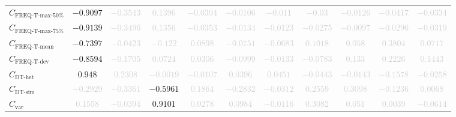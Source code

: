 \documentclass{standalone}
\newcommand{\varietyname}{\text{var}}
\newcommand{\variety}{C_{\varietyname}}
\newcommand{\freqmaxfiftyname}{\text{FREQ-T-max-50\%}}
\newcommand{\freqmaxfifty}{C_{\freqmaxfiftyname}}
\newcommand{\freqmaxseventyfivename}{\text{FREQ-T-max-75\%}}
\newcommand{\freqmaxseventyfive}{C_{\freqmaxseventyfivename}}
\newcommand{\freqmeanname}{\text{FREQ-T-mean}}
\newcommand{\freqmean}{C_{\freqmeanname}}
\newcommand{\freqdevname}{\text{FREQ-T-dev}}
\newcommand{\freqdev}{C_{\freqdevname}}
\newcommand{\dthetname}{\text{DT-het}}
\newcommand{\dthet}{C_{\dthetname}}
\newcommand{\dtsimname}{\text{DT-sim}}
\newcommand{\dtsim}{C_{\dtsimname}}
\begin{document}
\begin{tabular}{lcccccccccc}
$\freqmaxfifty$ & $-0.9097$ & \textcolor{lightgray}{$-0.3543$} & \textcolor{lightgray}{$0.1396$} & \textcolor{lightgray}{$-0.0394$} & \textcolor{lightgray}{$-0.0106$} & \textcolor{lightgray}{$-0.011$} & \textcolor{lightgray}{$-0.03$} & \textcolor{lightgray}{$-0.0126$} & \textcolor{lightgray}{$-0.0417$} & \textcolor{lightgray}{$-0.0334$} \\ 
$\freqmaxseventyfive$ & $-0.9139$ & \textcolor{lightgray}{$-0.3496$} & \textcolor{lightgray}{$0.1356$} & \textcolor{lightgray}{$-0.0353$} & \textcolor{lightgray}{$-0.0134$} & \textcolor{lightgray}{$-0.0123$} & \textcolor{lightgray}{$-0.0275$} & \textcolor{lightgray}{$-0.0097$} & \textcolor{lightgray}{$-0.0296$} & \textcolor{lightgray}{$-0.0319$} \\ 
$\freqmean$ & $-0.7397$ & \textcolor{lightgray}{$-0.0423$} & \textcolor{lightgray}{$-0.122$} & \textcolor{lightgray}{$0.0898$} & \textcolor{lightgray}{$-0.0751$} & \textcolor{lightgray}{$-0.0683$} & \textcolor{lightgray}{$0.1018$} & \textcolor{lightgray}{$0.058$} & \textcolor{lightgray}{$0.3804$} & \textcolor{lightgray}{$0.0717$} \\ 
$\freqdev$ & $-0.8594$ & \textcolor{lightgray}{$-0.1705$} & \textcolor{lightgray}{$0.0724$} & \textcolor{lightgray}{$0.0306$} & \textcolor{lightgray}{$-0.0999$} & \textcolor{lightgray}{$-0.0133$} & \textcolor{lightgray}{$-0.0783$} & \textcolor{lightgray}{$0.133$} & \textcolor{lightgray}{$0.2226$} & \textcolor{lightgray}{$0.1443$} \\ 
$\dthet$ & $0.948$ & \textcolor{lightgray}{$0.2308$} & \textcolor{lightgray}{$-0.0019$} & \textcolor{lightgray}{$-0.0107$} & \textcolor{lightgray}{$0.0396$} & \textcolor{lightgray}{$0.0451$} & \textcolor{lightgray}{$-0.0443$} & \textcolor{lightgray}{$-0.0143$} & \textcolor{lightgray}{$-0.1578$} & \textcolor{lightgray}{$-0.0258$} \\ 
$\dtsim$ & \textcolor{lightgray}{$-0.2929$} & \textcolor{lightgray}{$-0.3361$} & $-0.5961$ & \textcolor{lightgray}{$0.1864$} & \textcolor{lightgray}{$-0.2832$} & \textcolor{lightgray}{$-0.0312$} & \textcolor{lightgray}{$0.2559$} & \textcolor{lightgray}{$0.3098$} & \textcolor{lightgray}{$-0.1236$} & \textcolor{lightgray}{$0.0068$} \\ 
$\variety$ & \textcolor{lightgray}{$0.1558$} & \textcolor{lightgray}{$-0.0394$} & $0.9101$ & \textcolor{lightgray}{$0.0278$} & \textcolor{lightgray}{$0.0984$} & \textcolor{lightgray}{$-0.0116$} & \textcolor{lightgray}{$0.3082$} & \textcolor{lightgray}{$0.051$} & \textcolor{lightgray}{$0.0039$} & \textcolor{lightgray}{$-0.0614$} \\ 

\end{tabular}
\end{document}
